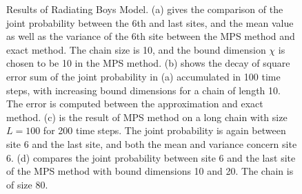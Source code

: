 \documentclass[english]{article}[12pt]
\begin{document}
\begin{figure}[H]
  \caption{Results of Radiating Boys Model. (a) gives the comparison of the joint probability between the 6th and last sites, and the mean value as well as the variance of the 6th site between the MPS method and exact method. The chain size is 10, and the bound dimension $\chi$ is chosen to be 10 in the MPS method. (b) shows the decay of square error sum of the joint probability in (a) accumulated in 100 time steps, with increasing bound dimensions for a chain of length 10. The error is computed between the approximation and exact method. (c) is the result of MPS method on a long chain with size $L=100$ for 200 time steps. The joint probability is again between site 6 and the last site, and both the mean and variance concern site 6. (d) compares the joint probability between site 6 and the last site of the MPS method with bound dimensions 10 and 20. The chain is of size 80.}
  \label{fig:Radiating_result}
\end{figure}
\end{document}
